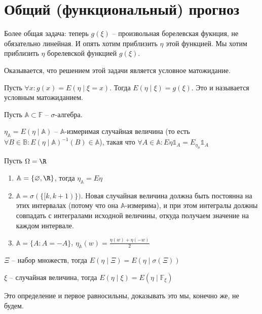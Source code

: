 \section{Общий (функциональный) прогноз}

Более общая задача: теперь $g(\xi)$ -- произвольная борелевская фукнция, не обязательно линейная.
И опять хотим приблизить $\eta$ этой функцией.    
Мы хотим приблизить $\eta$ борелевской функцией $g(\xi)$.

Оказывается, что решением этой задачи является условное матожидание.

\begin{Def}
Пусть $\forall x\colon g(x) = E(\eta \mid \xi = x)$. Тогда $E(\eta \mid \xi) = g(\xi)$. Это и называется условным матожиданием.
\end{Def}

\begin{Def}
    Пусть $\mathbb{A} \subset \mathbb{F}$ -- $\sigma$-алгебра.

    $\eta_\mathbb{A} = E(\eta \mid \mathbb{A})$ -- $\mathbb{A}$-измеримая случайная величина (то есть $\forall B \in \mathbb{B}\colon E(\eta \mid \mathbb{A})^{-1}(B) \in \mathbb{A}$),
    такая что $\forall A \in \mathbb{A}\colon E\eta \mathbb{1}_A = E_{\eta_\mathbb{A}} \mathbb{1}_A$
\end{Def}
\begin{exmp}
    Пусть $\Omega = \R$
    \begin{enumerate}
    \item
        $\mathbb{A} = \{\varnothing, \R\}$, тогда $\eta_\mathbb{A} = E\eta$
    \item
        $\mathbb{A} = \sigma(\{[k, k + 1)\})$. Новая случайная величина должна быть постоянна на этих интервалах (потому что она $\mathbb{A}$-измерима), 
        и при этом интегралы должны совпадать с интегралами исходной величины, откуда получаем значение на каждом интервале.
    \item   
        $\mathbb{A} = \{A \colon A = -A\}$, $\eta_\mathbb{A}(w) = \frac{\eta(w) + \eta(-w)}{2}$
    \end{enumerate}
\end{exmp}

\begin{Def}
    $\Xi$ -- набор множеств, тогда $E(\eta \mid \Xi) = E(\eta \mid \sigma(\Xi))$

    $\xi$ -- случайная величина, тогда $E(\eta \mid \xi) = E(\eta \mid \mathbb{F}_\xi)$
\end{Def}
\begin{Rem}
    Это определение и первое равносильны, доказывать это мы, конечно же, не будем.
\end{Rem}